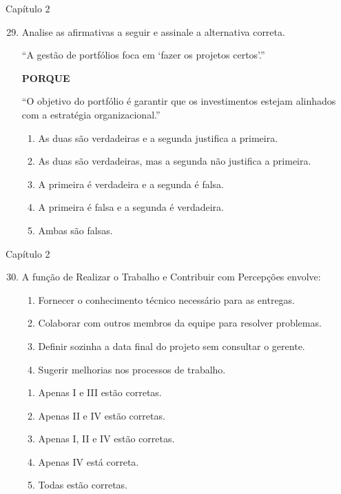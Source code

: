 \documentclass{beamer}
\begin{document}
\begin{frame}{Capítulo 2}
	\begin{enumerate}
		\setcounter{enumi}{28}
		\justifying
		\item Analise as afirmativas a seguir e assinale a alternativa correta.
		
		\vspace{10pt}
		``A gestão de portfólios foca em `fazer os projetos certos'.''
		
		\vspace{10pt}
		\centering \textbf{PORQUE}
		
		\vspace{10pt}
		\justifying
		``O objetivo do portfólio é garantir que os investimentos estejam alinhados com a estratégia organizacional.''
		
		\vspace{10pt}
		\begin{enumerate}[a]
			\item \alert<2>{As duas são verdadeiras e a segunda justifica a primeira}.
			\item As duas são verdadeiras, mas a segunda não justifica a primeira.
			\item A primeira é verdadeira e a segunda é falsa.
			\item A primeira é falsa e a segunda é verdadeira.
			\item Ambas são falsas.
		\end{enumerate}
	\end{enumerate}
\end{frame}

\begin{frame}{Capítulo 2}
	\begin{enumerate}
		\setcounter{enumi}{29}
		\justifying
		\item A função de Realizar o Trabalho e Contribuir com Percepções envolve:
		
		\begin{enumerate}[I]
			\item Fornecer o conhecimento técnico necessário para as entregas.
			\item Colaborar com outros membros da equipe para resolver problemas.
			\item Definir sozinha a data final do projeto sem consultar o gerente.
			\item Sugerir melhorias nos processos de trabalho.
		\end{enumerate}
		
		\vspace{10pt}
		\begin{enumerate}[a]
			\item Apenas I e III estão corretas.
			\item Apenas II e IV estão corretas.
			\item \alert<2>{Apenas I, II e IV estão corretas}.
			\item Apenas IV está correta.
			\item Todas estão corretas.
		\end{enumerate}
	\end{enumerate}
\end{frame}
\end{document}
